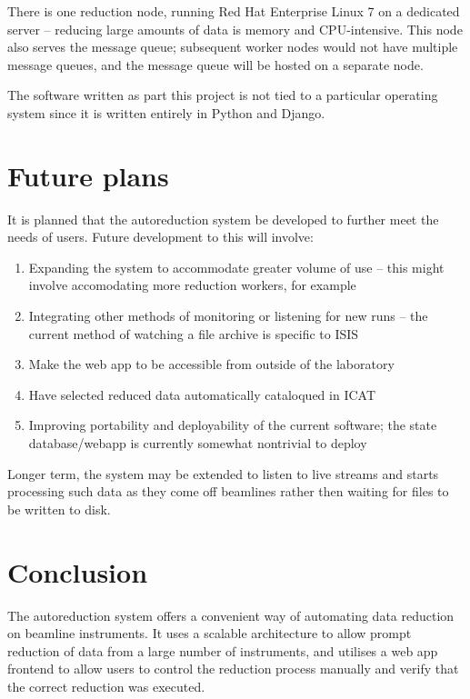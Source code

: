 \documentclass[twocolumn]{article}
\begin{document}
There is one reduction node, running Red Hat Enterprise Linux 7\cite{rhel}
on a dedicated server -- reducing large amounts of data is memory and CPU-intensive.
This node also serves the message queue; subsequent worker nodes would
not have multiple message queues, and the message queue will be hosted
on a separate node.

The software written as part this project is not tied to a
particular operating system since it is written entirely in Python and Django. 

\section{Future plans}\label{future-plans}

It is planned that the autoreduction system be developed to further meet
the needs of users. Future development to this will involve:

\begin{enumerate}
\item
  Expanding the system to accommodate greater volume of use -- this
  might involve accomodating more reduction workers, for example
\item
  Integrating other methods of monitoring or listening for new runs -- the current
  method of watching a file archive is specific to ISIS
\item
  Make the web app to be accessible from outside of the laboratory
\item
  Have selected reduced data automatically cataloqued in ICAT 
\item
  Improving portability and deployability of the current software; the
  state database/webapp is currently somewhat nontrivial to deploy
\end{enumerate}

Longer term, the system may be extended to listen to live streams and starts
processing such data as they come off beamlines rather then waiting for files 
to be written to disk. 

\section{Conclusion}\label{conclusion}

The autoreduction system offers a convenient way of automating data reduction
on beamline instruments. It uses a scalable architecture to allow prompt
reduction of data from a large number of instruments, and utilises a web app
frontend to allow users to control the reduction process manually and verify
that the correct reduction was executed.
\end{document}
